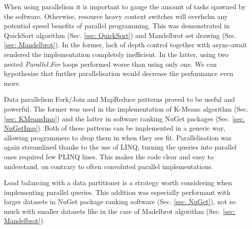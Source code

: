 When using parallelism it is important to gauge the amount of tasks spawned by the software. Otherwise, resource heavy context switches will overhelm any potential speed benefits of parallel programming. This was demonstrated in QuickSort algorithm (Sec. \ref{sec: QuickSort}) and Mandelbrot set drawing (Sec. \ref{sec: Mandelbrot}). In the former, lack of depth control together with async-await rendered the implementation completely inefficient. In the latter, using two nested \emph{Parallel.For} loops performed worse than using only one. We can hypothesize that further parallelisation would decrease the performance even more. 

Data parallelism Fork/Join and MapReduce patterns proved to be useful and powerful. The former was used in the implementation of K-Means algorithm (Sec. \ref{sec: KMeansImp}) and the latter in software ranking NuGet packages (Sec. \ref{sec: NuGetImp}). Both of these patterns can be implemented in a generic way, allowing programmers to drop them in when they see fit. Parallelisation was again streamlined thanks to the use of LINQ, turning the queries into parallel ones required few PLINQ lines. This makes the code clear and easy to understand, on contrary to often convoluted parallel implementations. 

Load balancing with a data partitioner is a strategy worth considering when implementing parallel queries. This addition was especially performant with larger datasets in NuGet package ranking software (Sec. \ref{sec: NuGet}), not so much with smaller datasets like in the case of Madelbrot algorithm (Sec. \ref{sec: Mandelbrot}). 

